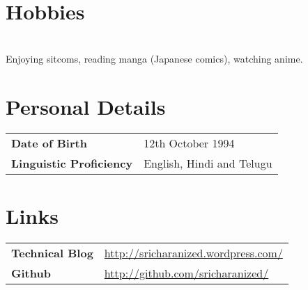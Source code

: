 \documentclass[margin]{res}
\begin{document}
\begin{resume}
\section{Hobbies}
\\Enjoying sitcoms, reading manga (Japanese comics), watching anime.

\section{Personal Details}
\begin{tabular}{l p{3.5in}}
      \bf{Date of Birth} & \hfill 12th October 1994\\
			\bf{Linguistic Proficiency} & \hfill  English, Hindi and Telugu\\
 \end{tabular}
\section{Links}
\begin{tabular}{l p{3.5in}}
      \bf{Technical Blog} & \hfill \underline{http://sricharanized.wordpress.com/}\\
			\bf{Github} & \hfill  \underline{http://github.com/sricharanized/}\\
 \end{tabular}


\end{resume}
\end{document}
